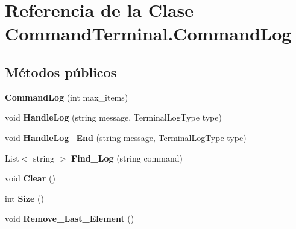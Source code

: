 \hypertarget{class_command_terminal_1_1_command_log}{}\section{Referencia de la Clase Command\+Terminal.\+Command\+Log}
\label{class_command_terminal_1_1_command_log}
\subsection*{Métodos públicos}
\begin{DoxyCompactItemize}
\item 
\mbox{\label{class_command_terminal_1_1_command_log_a1e8323467312989d520bb41e5b544336}} 
{\bfseries Command\+Log} (int max\+\_\+items)
\item 
\mbox{\label{class_command_terminal_1_1_command_log_ae51ecfc86979778ea965b5aa737db744}} 
void {\bfseries Handle\+Log} (string message, Terminal\+Log\+Type type)
\item 
\mbox{\label{class_command_terminal_1_1_command_log_a495c15dfa1c015a7b5d029b7416fd906}} 
void {\bfseries Handle\+Log\+\_\+\+End} (string message, Terminal\+Log\+Type type)
\item 
\mbox{\label{class_command_terminal_1_1_command_log_ab580a187e77fe1d3e91a55d5405e81ce}} 
List$<$ string $>$ {\bfseries Find\+\_\+\+Log} (string command)
\item 
\mbox{\label{class_command_terminal_1_1_command_log_a057f3008fd63b0ba047e31649584715f}} 
void {\bfseries Clear} ()
\item 
\mbox{\label{class_command_terminal_1_1_command_log_a89057cc469791017cfbf27bbd8a74e86}} 
int {\bfseries Size} ()
\item 
\mbox{\label{class_command_terminal_1_1_command_log_a61a97fba295d961a87955a648881946d}} 
void {\bfseries Remove\+\_\+\+Last\+\_\+\+Element} ()
\end{DoxyCompactItemize}
